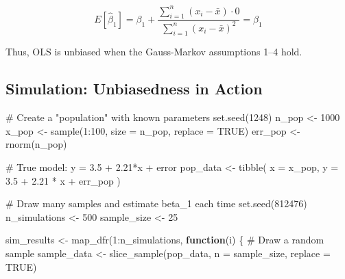 \documentclass[
  letterpaper,
  DIV=11,
  numbers=noendperiod]{scrreprt}
\newenvironment{Shaded}{\begin{snugshade}}{\end{snugshade}}
\newcommand{\AttributeTok}[1]{\textcolor[rgb]{0.40,0.45,0.13}{#1}}
\newcommand{\CommentTok}[1]{\textcolor[rgb]{0.37,0.37,0.37}{#1}}
\newcommand{\ConstantTok}[1]{\textcolor[rgb]{0.56,0.35,0.01}{#1}}
\newcommand{\ControlFlowTok}[1]{\textcolor[rgb]{0.00,0.23,0.31}{\textbf{#1}}}
\newcommand{\DecValTok}[1]{\textcolor[rgb]{0.68,0.00,0.00}{#1}}
\newcommand{\FloatTok}[1]{\textcolor[rgb]{0.68,0.00,0.00}{#1}}
\newcommand{\FunctionTok}[1]{\textcolor[rgb]{0.28,0.35,0.67}{#1}}
\newcommand{\NormalTok}[1]{\textcolor[rgb]{0.00,0.23,0.31}{#1}}
\newcommand{\OtherTok}[1]{\textcolor[rgb]{0.00,0.23,0.31}{#1}}
\newcommand{\SpecialCharTok}[1]{\textcolor[rgb]{0.37,0.37,0.37}{#1}}
\begin{document}
\[
E[\hat{\beta}_1] = \beta_1 + \frac{\sum_{i=1}^{n}(x_i - \bar{x}) \cdot 0}{\sum_{i=1}^{n}(x_i - \bar{x})^2} = \beta_1
\]

Thus, OLS is unbiased when the Gauss-Markov assumptions 1--4 hold.

\subsection{Simulation: Unbiasedness in
Action}\label{simulation-unbiasedness-in-action}

\begin{tcolorbox}[enhanced jigsaw, arc=.35mm, bottomrule=.15mm, bottomtitle=1mm, breakable, colback=white, colbacktitle=quarto-callout-note-color!10!white, colframe=quarto-callout-note-color-frame, coltitle=black, left=2mm, leftrule=.75mm, opacityback=0, opacitybacktitle=0.6, rightrule=.15mm, title=\textcolor{quarto-callout-note-color}{\faInfo}\hspace{0.5em}{Show Code: Unbiasedness Simulation}, titlerule=0mm, toprule=.15mm, toptitle=1mm]

\begin{Shaded}
\begin{Highlighting}[]
\CommentTok{\# Create a "population" with known parameters}
\FunctionTok{set.seed}\NormalTok{(}\DecValTok{1248}\NormalTok{)}
\NormalTok{n\_pop }\OtherTok{\textless{}{-}} \DecValTok{1000}
\NormalTok{x\_pop }\OtherTok{\textless{}{-}} \FunctionTok{sample}\NormalTok{(}\DecValTok{1}\SpecialCharTok{:}\DecValTok{100}\NormalTok{, }\AttributeTok{size =}\NormalTok{ n\_pop, }\AttributeTok{replace =} \ConstantTok{TRUE}\NormalTok{)}
\NormalTok{err\_pop }\OtherTok{\textless{}{-}} \FunctionTok{rnorm}\NormalTok{(n\_pop)}

\CommentTok{\# True model: y = 3.5 + 2.21*x + error}
\NormalTok{pop\_data }\OtherTok{\textless{}{-}} \FunctionTok{tibble}\NormalTok{(}
  \AttributeTok{x =}\NormalTok{ x\_pop,}
  \AttributeTok{y =} \FloatTok{3.5} \SpecialCharTok{+} \FloatTok{2.21} \SpecialCharTok{*}\NormalTok{ x }\SpecialCharTok{+}\NormalTok{ err\_pop}
\NormalTok{)}

\CommentTok{\# Draw many samples and estimate beta\_1 each time}
\FunctionTok{set.seed}\NormalTok{(}\DecValTok{812476}\NormalTok{)}
\NormalTok{n\_simulations }\OtherTok{\textless{}{-}} \DecValTok{500}
\NormalTok{sample\_size }\OtherTok{\textless{}{-}} \DecValTok{25}

\NormalTok{sim\_results }\OtherTok{\textless{}{-}} \FunctionTok{map\_dfr}\NormalTok{(}\DecValTok{1}\SpecialCharTok{:}\NormalTok{n\_simulations, }\ControlFlowTok{function}\NormalTok{(i) \{}
  \CommentTok{\# Draw a random sample}
\NormalTok{  sample\_data }\OtherTok{\textless{}{-}} \FunctionTok{slice\_sample}\NormalTok{(pop\_data, }\AttributeTok{n =}\NormalTok{ sample\_size, }\AttributeTok{replace =} \ConstantTok{TRUE}\NormalTok{)}
  

\end{Highlighting}
\end{Shaded}
\end{tcolorbox}
\end{document}
